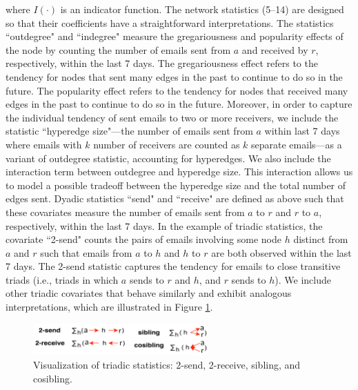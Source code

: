 \documentclass[ba]{imsart}
\numberwithin{equation}{section}
\theoremstyle{plain}
\begin{document}
	where $I(\cdot)$ is an indicator function. The network statistics (5--14) are designed so that their coefficients have a straightforward interpretations. The statistics ``outdegree" and ``indegree" measure the gregariousness and popularity effects of the node by counting the number of emails sent from $a$ and received by $r$, respectively, within the last 7 days. The gregariousness effect refers to the tendency for nodes that sent many edges in the past to continue to do so in the future. The popularity effect refers to the tendency for nodes that received many edges in the past to continue to do so in the future. Moreover, in order to capture the individual tendency of sent emails to two or more receivers, we include the statistic ``hyperedge size"---the number of emails sent from $a$ within last 7 days where emails with $k$ number of receivers are counted as $k$ separate emails---as a variant of outdegree statistic, accounting for hyperedges. We also include the interaction term between outdegree and hyperedge size. This interaction allows us to model a possible tradeoff between the hyperedge size and the total number of edges sent. Dyadic statistics ``send" and ``receive" are defined as above such that these covariates measure the number of emails sent from $a$ to $r$ and $r$ to $a$, respectively, within the last 7 days. In the example of triadic statistics, the covariate ``2-send" counts the pairs of emails involving some node $h$ distinct from $a$ and $r$ such that emails from $a$ to $h$ and $h$ to $r$ are both observed within the last 7 days. The 2-send statistic captures the tendency for emails to close transitive triads (i.e., triads in which $a$ sends to $r$ and $h$, and $r$ sends to $h$). We include other triadic covariates that behave similarly and exhibit analogous interpretations, which are illustrated in Figure \ref{figure:netstats}.
	\begin{figure}[!t]
		\centering
		\includegraphics[width=0.6\textwidth]{img/triad-1.png}	
		\caption {Visualization of triadic statistics: 2-send, 2-receive, sibling, and cosibling.}
		\label{figure:netstats}
	\end{figure}
	
\end{document}
